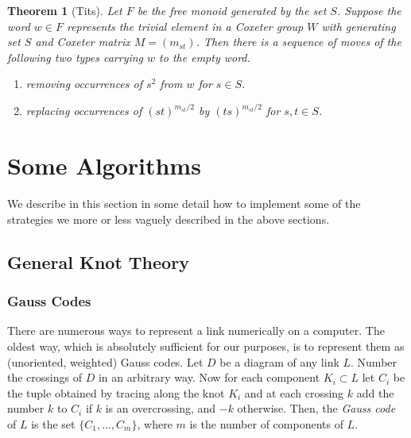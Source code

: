 \documentclass[a4paper]{article}
\newtheorem{theorem}{Theorem}[section]
\theoremstyle{definition}
\begin{document}
\begin{theorem}[Tits]\label{thm:word-problem}
Let $F$ be the free monoid generated by the set $S$. Suppose the word $w \in F$ represents the trivial element in a Coxeter group $W$ with generating set $S$ and Coxeter matrix $M = (m_{st})$. Then there is a sequence of moves of the following two types carrying $w$ to the empty word.

\begin{enumerate}
\item removing occurrences of $s^2$ from $w$ for $s \in S$.
\item replacing occurrences of $(st)^{m_{st}/2}$ by $(ts)^{m_{st}/2}$ for $s, t \in S$.
\end{enumerate}

\end{theorem}

\newpage

\section{Some Algorithms}
We describe in this section in some detail how to implement some of the strategies we more or less vaguely described in the above sections.
\subsection{General Knot Theory}
\subsubsection{Gauss Codes}
There are numerous ways to represent a link numerically on a computer. The oldest way, which is absolutely sufficient for our purposes, is to represent them as (unoriented, weighted) Gauss codes. Let $D$ be a diagram of any link $L$. Number the crossings of $D$ in an arbitrary way. Now for each component $K_i \subset L$ let $C_i$ be the tuple obtained by tracing along the knot $K_i$ and at each crossing $k$ add the number $k$ to $C_i$ if $k$ is an overcrossing, and $-k$ otherwise.
Then, the \textit{Gauss code} of $L$ is the set $\{C_1, \dots, C_m\}$, where $m$ is the number of components of $L$.
\end{document}
